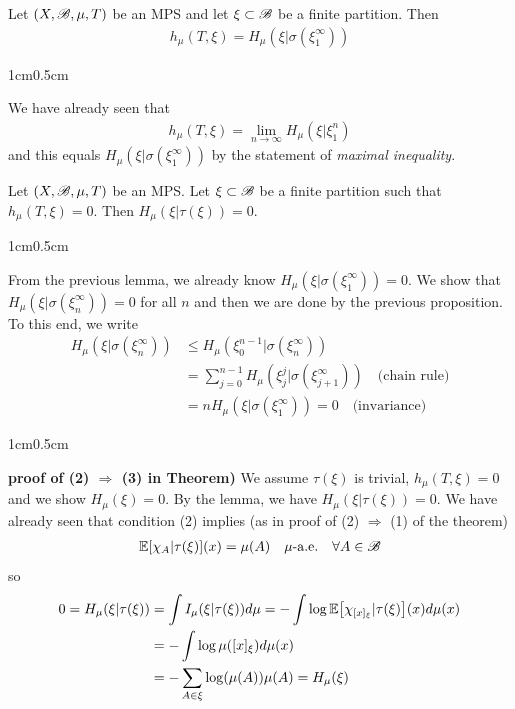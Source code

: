 \documentclass[12pt,a4paper]{report}
\newenvironment{proof}
{\begin{changemargin}{1cm}{0.5cm} 
	}%
	{\end{changemargin}
}
\begin{document}
\lem Let $(X, \mathscr{B}, \mu, T)$ be an MPS and let $\xi \subset \mathscr{B}$ be a finite partition. Then
\begin{align*}
h_{\mu} (T, \xi ) = H_{\mu}(\xi | \sigma(\xi_1^{\infty}))
\end{align*}
\begin{proof}
\pf We have already seen that
\begin{align*}
h_{\mu}(T, \xi )= \lim_{n\rightarrow \infty} H_{\mu}(\xi | \xi_1^n) 
\end{align*}
and this equals $H_{\mu}(\xi | \sigma(\xi_1^{\infty}))$ by the statement of \emph{maximal inequality}.

\eop
\end{proof}
\s

\lem Let $(X,\mathscr{B}, \mu, T)$ be an MPS. Let $\xi \subset \mathscr{B}$ be a finite partition such that $h_{\mu}(T, \xi) =0$. Then $H_{\mu}(\xi | \tau(\xi)) =0$. 
\begin{proof}
\pf From the previous lemma, we already know $H_{\mu}(\xi | \sigma(\xi_1^{\infty})) =0$. We show that $H_{\mu}(\xi | \sigma(\xi_n^{\infty})) =0$ for all $n$ and then we are done by the previous proposition. To this end, we write
\begin{align*}
H_{\mu}(\xi | \sigma(\xi_n^{\infty})) &\leq H_{\mu} (\xi_0^{n-1} | \sigma(\xi_n^{\infty})) \\
&= \sum_{j=0}^{n-1} H_{\mu}(\xi_j^j | \sigma(\xi_{j+1}^{\infty})) \quad \text{(chain rule)} \\
&= nH_{\mu}(\xi | \sigma(\xi_1^{\infty})) =0 \quad \text{(invariance)}
\end{align*}

\eop
\end{proof}
\s

\begin{proof}
\textbf{proof of (2) $\Rightarrow$ (3) in Theorem)} We assume $\tau (\xi)$ is trivial, $h_{\mu}(T, \xi) =0$ and we show $H_{\mu}(\xi) =0$. By the lemma, we have $H_{\mu}(\xi | \tau(\xi)) =0$. We have already seen that condition (2) implies (as in proof of (2) $\Rightarrow$ (1) of the theorem)
\begin{align*}
\mathbb{E} [\chi_A | \tau(\xi)](x) = \mu(A) \quad \mu \text{-a.e.} \quad \forall A \in \mathscr{B}
\end{align*}
so
\begin{align*}
0=H_{\mu}(\xi | \tau(\xi)) &= \int I_{\mu}(\xi | \tau(\xi))d\mu = -\int \log \mathbb{E} \big[ \chi_{[x]_{\xi}} | \tau(\xi) \big](x) d\mu(x) \\
&= - \int \log \mu([x]_{\xi}) d\mu(x) \\
&= - \sum_{A \in \xi} \log( \mu(A)) \mu(A) = H_{\mu} (\xi)
\end{align*}
\end{proof}
\s
\end{document}
